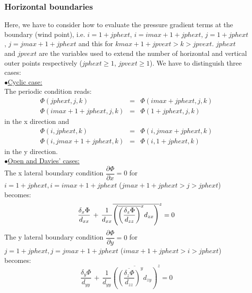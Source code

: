 \subsubsection {Horizontal boundaries }
Here, we have to consider how to evaluate the pressure gradient terms at the
boundary (wind point), i.e. $i = 1+jphext$, $i= imax+1+jphext$, $j = 1+jphext$,
$j = jmax+1+jphext$ and this for $kmax+1+jpvext > k > jpvext$. $jphext$ and
$jpvext$ are the variables used to extend the number of horizontal and vertical
outer points respectively ($jphext \geq 1$, $jpvext \geq 1$). We have to
distinguish three cases:\\
$\bullet$\underline{Cyclic case:}\\
The periodic condition reads:\\
\begin{eqnarray}
\label{cyclic1}
 \Phi (jphext, j, k) &=& \Phi (imax+jphext, j, k) \\
\nonumber
\Phi (imax+1+jphext, j, k) &=& \Phi (1+jphext, j, k)
\end{eqnarray}
 in the x direction and
\begin{eqnarray}
\label{cyclic2}
 \Phi (i, jphext, k) &=& \Phi (i, jmax+jphext, k) \\
\nonumber
\Phi (i, jmax+1+jphext, k) &=& \Phi (i, 1+jphext, k)
\end{eqnarray}
in the y direction.\\
$\bullet$\underline{Open and Davies' cases:}\\
The x lateral boundary condition $\dfrac{\partial{\Phi } } {\partial{x} } = 0
$ for $i = 1+jphext, i= imax+1+jphext$ ($jmax+1+jphext>j>jphext$) becomes:
\begin{equation}
\label{open1}
\dfrac{\delta_{x} \Phi}{d_{xx}}  \, +  \,  \dfrac{1}{d_{xx}}
\overline{ \left(\overline{ \left(\dfrac{\delta_{z} \Phi}{d_{zz}}
\right)}^{x}d_{zx}\right)}^{z} = 0
\nonumber \\
\end{equation}
The y lateral boundary condition $\dfrac{\partial{\Phi } } {\partial{y} } = 0 $
for $j = 1+jphext, j= jmax+1+jphext$ ($imax+1+jphext>i>jphext$)
becomes:
\begin{equation}
\label{open2}
 \dfrac{\delta_{y} \Phi}{d_{yy}}  \, + \,   \dfrac{1}{d_{yy}}
\overline{ \left(\overline{ \left(\dfrac{\delta_{z} \Phi}{d_{zz}}
\right)}^{y}d_{zy}\right)}^{z} = 0
\end{equation}
